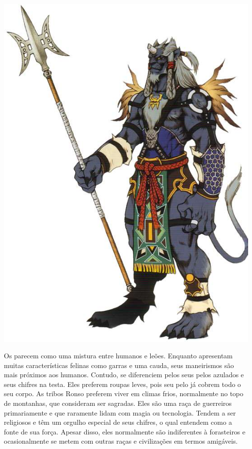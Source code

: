 \begin{center} \includegraphics[width=\columnwidth]{./art/races/ronso.jpg} \end{center}
%
Os  parecem como uma mistura entre humanos e leões.
Enquanto apresentam muitas características felinas como garras e uma cauda, seus maneirismos são mais próximos aos humanos.
Contudo, se diferenciem pelos seus pelos azulados e seus chifres na testa.
Eles preferem roupas leves, pois seu pelo já cobrem todo o seu corpo.
As tribos Ronso preferem viver em climas frios, normalmente no topo de montanhas, que consideram ser sagradas.
Eles são uma raça de guerreiros primariamente e que raramente lidam com magia ou tecnologia. Tendem a ser religiosos e têm um orgulho especial de seus chifres, o qual entendem como a fonte de sua força.
Apesar disso, eles normalmente são indiferentes à forasteiros e ocasionalmente se metem com outras raças e civilizações em termos amigáveis.
